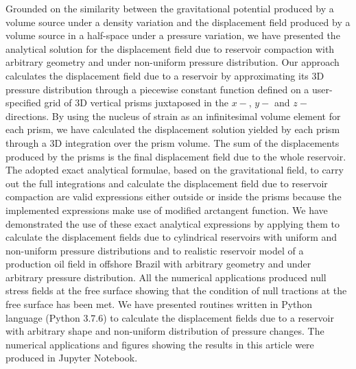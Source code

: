 \conclusions  %

Grounded on the similarity between the gravitational potential produced by a volume source under a density variation and the displacement field produced by a volume source in a half-space under a pressure variation, we have presented the analytical solution for the displacement field due to reservoir compaction with arbitrary geometry and under non-uniform  pressure distribution.
Our approach calculates the displacement field due to a reservoir by approximating its 3D pressure distribution through a piecewise constant function defined on a user-specified grid of 3D vertical prisms juxtaposed in the $x-$, $y-$ and $z-$directions.
By using the nucleus of strain as an infinitesimal volume element for each prism, 
we have calculated the displacement solution yielded by each prism through a 3D integration over the prism volume. 
The sum of the displacements produced by the prisms is the final displacement field due to the whole reservoir.
The adopted exact analytical formulae, based on the gravitational field,  to carry out the full integrations and calculate the displacement field due to reservoir compaction are valid expressions either outside or inside the prisms because the implemented expressions make use of  modified arctangent function.
We have demonstrated the use of these exact analytical expressions by applying them to calculate the displacement fields due to cylindrical reservoirs with uniform and non-uniform pressure distributions and to realistic reservoir model of a production oil field in offshore Brazil with arbitrary geometry and under arbitrary pressure distribution.
All the numerical applications produced null stress fields  at the free surface
showing that the condition of null tractions at the free surface has been met. 
We have presented routines written in Python language (Python 3.7.6)  to calculate the displacement fields due to a reservoir with arbitrary shape and non-uniform distribution of pressure changes. 
The numerical applications and figures showing the results in this article were produced in
Jupyter Notebook. 






